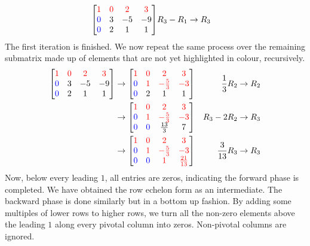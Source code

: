 \begin{solution}
\begin{align*}
\begin{bmatrix}
\textcolor{red}{1} & \textcolor{red}{0} & \textcolor{red}{2} & \textcolor{red}{3} \\
\textcolor{blue}{0} & 3 & -5 & -9 \\
\textcolor{blue}{0} & 2 & 1 & 1
\end{bmatrix}
& R_3-R_1 \to R_3
\end{align*}
The first iteration is finished. We now repeat the same process over the remaining submatrix made up of elements that are not yet highlighted in colour, recursively.
\begin{align*}
\begin{bmatrix}
\textcolor{red}{1} & \textcolor{red}{0} & \textcolor{red}{2} & \textcolor{red}{3} \\
\textcolor{blue}{0} & 3 & -5 & -9 \\
\textcolor{blue}{0} & 2 & 1 & 1
\end{bmatrix}
&\to
\begin{bmatrix}
\textcolor{red}{1} & \textcolor{red}{0} & \textcolor{red}{2} & \textcolor{red}{3} \\
\textcolor{blue}{0} & \textcolor{red}{1} & \textcolor{red}{-\frac{5}{3}} & \textcolor{red}{-3} \\
\textcolor{blue}{0} & 2 & 1 & 1
\end{bmatrix}
& \frac{1}{3}R_2 \to R_2 \\
&\to
\begin{bmatrix}
\textcolor{red}{1} & \textcolor{red}{0} & \textcolor{red}{2} & \textcolor{red}{3} \\
\textcolor{blue}{0} & \textcolor{red}{1} & \textcolor{red}{-\frac{5}{3}} & \textcolor{red}{-3} \\
\textcolor{blue}{0} & \textcolor{blue}{0} & \frac{13}{3} & 7
\end{bmatrix}
& R_3-2R_2 \to R_3 \\
&\to
\begin{bmatrix}
\textcolor{red}{1} & \textcolor{red}{0} & \textcolor{red}{2} & \textcolor{red}{3} \\
\textcolor{blue}{0} & \textcolor{red}{1} & \textcolor{red}{-\frac{5}{3}} & \textcolor{red}{-3} \\
\textcolor{blue}{0} & \textcolor{blue}{0} & \textcolor{red}{1} & \textcolor{red}{\frac{21}{13}}
\end{bmatrix}
& \frac{3}{13}R_3 \to R_3 
\end{align*}
Now, below every leading $1$, all entries are zeros, indicating the forward phase is completed. We have obtained the row echelon form as an intermediate. The backward phase is done similarly but in a bottom up fashion. By adding some multiples of lower rows to higher rows, we turn all the non-zero elements above the leading $1$ along every pivotal column into zeros. Non-pivotal columns are ignored.

\end{solution}
